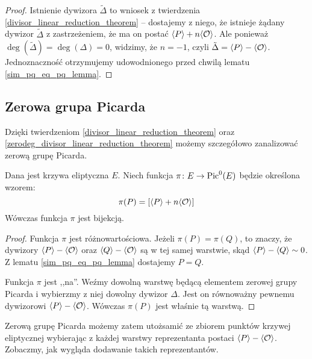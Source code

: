 \begin{proof}
Istnienie dywizora $\tilde{\Delta}$ to wniosek z twierdzenia
\ref{divisor_linear_reduction_theorem} --
dostajemy z niego, że istnieje żądany dywizor $\tilde{\Delta}$
z zastrzeżeniem, że ma on postać $\langle P\rangle + n\langle\mathcal{O}\rangle$.
Ale ponieważ $\deg(\tilde{\Delta}) = \deg(\Delta) = 0$,
widzimy, że $n = -1$, czyli $\tilde{\Delta} = \langle P\rangle - \langle\mathcal{O}\rangle$.
Jednoznaczność otrzymujemy udowodnionego przed chwilą lematu
\ref{sim_pq_eq_pq_lemma}.
\end{proof}

\subsection*{Zerowa grupa Picarda}

Dzięki twierdzeniom \ref{divisor_linear_reduction_theorem}
oraz \ref{zerodeg_divisor_linear_reduction_theorem}
możemy szczegółowo zanalizować zerową grupę Picarda.

\begin{theorem}\label{piczero_curvepts_bijection_theorem}
Dana jest krzywa eliptyczna $E$.
Niech funkcja $\pi\colon E \to \operatorname{Pic}^0(E)$ będzie określona wzorem:
\begin{equation}
\pi(P) = [\langle P\rangle + n\langle\mathcal{O}\rangle]
\end{equation}
Wówczas funkcja $\pi$ jest bijekcją.
\end{theorem}

\begin{proof}
Funkcja $\pi$ jest różnowartościowa. Jeżeli $\pi(P) = \pi(Q)$,
to znaczy, że dywizory $\langle P\rangle - \langle\mathcal{O}\rangle$
oraz $\langle Q\rangle - \langle\mathcal{O}\rangle$ są w tej samej warstwie,
skąd $\langle P\rangle - \langle Q\rangle \sim 0$.
Z lematu \ref{sim_pq_eq_pq_lemma} dostajemy $P = Q$.

Funkcja $\pi$ jest ,,na''. Weźmy dowolną warstwę będącą elementem
zerowej grupy Picarda i wybierzmy z niej dowolny dywizor $\Delta$.
Jest on równoważny pewnemu dywizorowi $\langle P\rangle - \langle\mathcal{O}\rangle$.
Wówczas $\pi(P)$ jest właśnie tą warstwą.
\end{proof}

Zerową grupę Picarda możemy zatem utożsamić
ze zbiorem punktów krzywej eliptycznej
wybierając z każdej warstwy reprezentanta postaci $\langle P\rangle - \langle\mathcal{O}\rangle$.
Zobaczmy, jak wygląda dodawanie takich reprezentantów.

